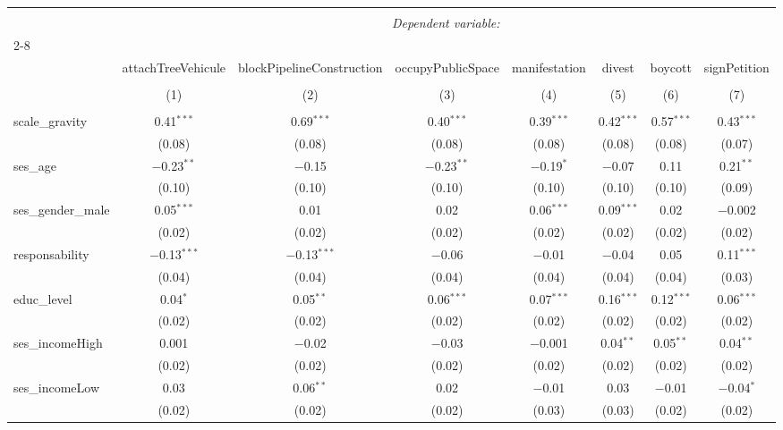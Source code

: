\documentclass[
]{article}
\begin{document}
\begin{sidewaystable}[!htbp] \centering 
  \caption{Interaction âge-préoccupations 2} 
  \label{} 
\begin{tabular}{@{\extracolsep{1pt}}lccccccc} 
\\[-1.8ex]\hline 
\hline \\[-1.8ex] 
 & \multicolumn{7}{c}{\textit{Dependent variable:}} \\ 
\cline{2-8} 
\\[-1.8ex] & attachTreeVehicule & blockPipelineConstruction & occupyPublicSpace & manifestation & divest & boycott & signPetition \\ 
\\[-1.8ex] & (1) & (2) & (3) & (4) & (5) & (6) & (7)\\ 
\hline \\[-1.8ex] 
 scale\_gravity & 0.41$^{***}$ & 0.69$^{***}$ & 0.40$^{***}$ & 0.39$^{***}$ & 0.42$^{***}$ & 0.57$^{***}$ & 0.43$^{***}$ \\ 
  & (0.08) & (0.08) & (0.08) & (0.08) & (0.08) & (0.08) & (0.07) \\ 
  ses\_age & $-$0.23$^{**}$ & $-$0.15 & $-$0.23$^{**}$ & $-$0.19$^{*}$ & $-$0.07 & 0.11 & 0.21$^{**}$ \\ 
  & (0.10) & (0.10) & (0.10) & (0.10) & (0.10) & (0.10) & (0.09) \\ 
  ses\_gender\_male & 0.05$^{***}$ & 0.01 & 0.02 & 0.06$^{***}$ & 0.09$^{***}$ & 0.02 & $-$0.002 \\ 
  & (0.02) & (0.02) & (0.02) & (0.02) & (0.02) & (0.02) & (0.02) \\ 
  responsability & $-$0.13$^{***}$ & $-$0.13$^{***}$ & $-$0.06 & $-$0.01 & $-$0.04 & 0.05 & 0.11$^{***}$ \\ 
  & (0.04) & (0.04) & (0.04) & (0.04) & (0.04) & (0.04) & (0.03) \\ 
  educ\_level & 0.04$^{*}$ & 0.05$^{**}$ & 0.06$^{***}$ & 0.07$^{***}$ & 0.16$^{***}$ & 0.12$^{***}$ & 0.06$^{***}$ \\ 
  & (0.02) & (0.02) & (0.02) & (0.02) & (0.02) & (0.02) & (0.02) \\ 
  ses\_incomeHigh & 0.001 & $-$0.02 & $-$0.03 & $-$0.001 & 0.04$^{**}$ & 0.05$^{**}$ & 0.04$^{**}$ \\ 
  & (0.02) & (0.02) & (0.02) & (0.02) & (0.02) & (0.02) & (0.02) \\ 
  ses\_incomeLow & 0.03 & 0.06$^{**}$ & 0.02 & $-$0.01 & 0.03 & $-$0.01 & $-$0.04$^{*}$ \\ 
  & (0.02) & (0.02) & (0.02) & (0.03) & (0.03) & (0.02) & (0.02) \\ 

\end{tabular}
\end{sidewaystable}
\end{document}
